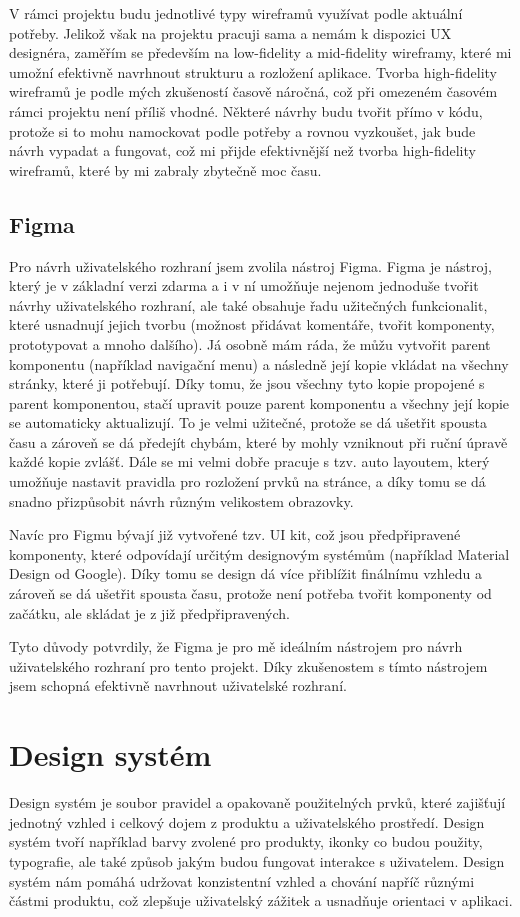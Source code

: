 V rámci projektu budu jednotlivé typy wireframů využívat podle aktuální potřeby. Jelikož však na projektu pracuji sama a nemám k dispozici UX designéra, zaměřím se především na low-fidelity a mid-fidelity wireframy, které mi umožní efektivně navrhnout strukturu a rozložení aplikace. Tvorba high-fidelity wireframů je podle mých zkušeností časově náročná, což při omezeném časovém rámci projektu není příliš vhodné. Některé návrhy budu tvořit přímo v kódu, protože si to mohu namockovat podle potřeby a rovnou vyzkoušet, jak bude návrh vypadat a fungovat, což mi přijde efektivnější než tvorba high-fidelity wireframů, které by mi zabraly zbytečně moc času.

\subsection{Figma}
Pro návrh uživatelského rozhraní jsem zvolila nástroj Figma. Figma je nástroj, který je v základní verzi zdarma a i v ní umožňuje nejenom jednoduše tvořit návrhy uživatelského rozhraní, ale také obsahuje řadu užitečných funkcionalit, které usnadnují jejich tvorbu (možnost přidávat komentáře, tvořit komponenty, prototypovat a mnoho dalšího). Já osobně mám ráda, že můžu vytvořit parent komponentu (například navigační menu) a následně její kopie vkládat na všechny stránky, které ji potřebují. Díky tomu, že jsou všechny tyto kopie propojené s parent komponentou, stačí upravit pouze parent komponentu a všechny její kopie se automaticky aktualizují. To je velmi užitečné, protože se dá ušetřit spousta času a zároveň se dá předejít chybám, které by mohly vzniknout při ruční úpravě každé kopie zvlášť. Dále se mi velmi dobře pracuje s tzv. auto layoutem, který umožňuje nastavit pravidla pro rozložení prvků na stránce, a díky tomu se dá snadno přizpůsobit návrh různým velikostem obrazovky. \cite{figma}

Navíc pro Figmu bývají již vytvořené tzv. UI kit, což jsou předpřipravené komponenty, které odpovídají určitým designovým systémům (například Material Design od Google). Díky tomu se design dá více přiblížit finálnímu vzhledu a zároveň se dá ušetřit spousta času, protože není potřeba tvořit komponenty od začátku, ale skládat je z již předpřipravených. \cite{figma:uiKits}

Tyto důvody potvrdily, že Figma je pro mě ideálním nástrojem pro návrh uživatelského rozhraní pro tento projekt. Díky zkušenostem s tímto nástrojem jsem schopná efektivně navrhnout uživatelské rozhraní.

\section{Design systém}
Design systém je soubor pravidel a opakovaně použitelných prvků, které zajišťují jednotný vzhled i celkový dojem z produktu a uživatelského prostředí. Design systém tvoří například barvy zvolené pro produkty, ikonky co budou použity, typografie, ale také způsob jakým budou fungovat interakce s uživatelem. Design systém nám pomáhá udržovat konzistentní vzhled a chování napříč různými částmi produktu, což zlepšuje uživatelský zážitek a usnadňuje orientaci v aplikaci. \cite{designSystems}

